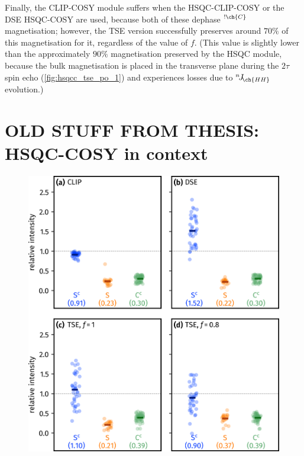 \documentclass[a4paper,12pt]{article}
\newcommand{\magnnot}[1]{\ch{^1H}$^{!\ch{#1}}$}
\newcommand{\nJ}[1]{{}^{n}\!J_{\!\ch{#1}}}
\begin{document}
\begin{refsection}
Finally, the CLIP-COSY module suffers when the HSQC-CLIP-COSY or the DSE HSQC-COSY are used, because both of these dephase \magnnot{C} magnetisation;
however, the TSE version successfully preserves around $70\%$ of this magnetisation for it, regardless of the value of $f$.
(This value is slightly lower than the approximately $90\%$ magnetisation preserved by the HSQC module, because the bulk magnetisation is placed in the transverse plane during the $2\tau$ spin echo (\cref{fig:hsqcc_tse_po_1}) and experiences losses due to $\nJ{HH}$ evolution.)


\section{OLD STUFF FROM THESIS: HSQC-COSY in context}

\begin{figure}[!ht]
    \centering
    \includegraphics[]{hsqccosy_sens_with_hmbc.png}%
    {\label{fig:hsqccosy_sens_with_hmbc_clip}}%
    {\label{fig:hsqccosy_sens_with_hmbc_dse}}%
    {\label{fig:hsqccosy_sens_with_hmbc_tse_1}}%
    {\label{fig:hsqccosy_sens_with_hmbc_tse_0p8}}%
    \caption[Sensitivity comparisons for  supersequences]{
}
\end{figure}
\end{refsection}
\end{document}
